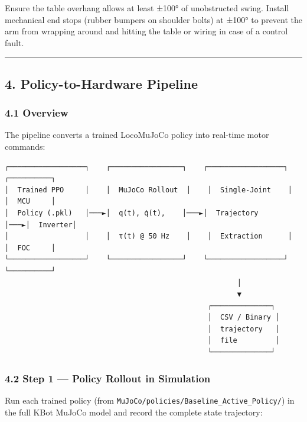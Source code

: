 \documentclass[
]{article}
\begin{document}
Ensure the table overhang allows at least ±100° of unobstructed swing.
Install mechanical end stops (rubber bumpers on shoulder bolts) at ±100°
to prevent the arm from wrapping around and hitting the table or wiring
in case of a control fault.

\begin{center}\rule{0.5\linewidth}{0.5pt}\end{center}

\subsection{4. Policy-to-Hardware
Pipeline}\label{policy-to-hardware-pipeline}

\subsubsection{4.1 Overview}\label{overview}

The pipeline converts a trained LocoMuJoCo policy into real-time motor
commands:

\begin{verbatim}
┌──────────────────┐    ┌─────────────────┐    ┌──────────────────┐    ┌──────────┐
│  Trained PPO     │    │  MuJoCo Rollout  │    │  Single-Joint    │    │  MCU     │
│  Policy (.pkl)   │───►│  q(t), q̇(t),    │───►│  Trajectory      │───►│  Inverter│
│                  │    │  τ(t) @ 50 Hz    │    │  Extraction      │    │  FOC     │
└──────────────────┘    └─────────────────┘    └──────────────────┘    └──────────┘
                                                       │
                                                       ▼
                                                ┌──────────────┐
                                                │  CSV / Binary │
                                                │  trajectory   │
                                                │  file         │
                                                └──────────────┘
\end{verbatim}

\subsubsection{4.2 Step 1 --- Policy Rollout in
Simulation}\label{step-1-policy-rollout-in-simulation}

Run each trained policy (from
\texttt{MuJoCo/policies/Baseline\_Active\_Policy/}) in the full KBot
MuJoCo model and record the complete state trajectory:
\end{document}
